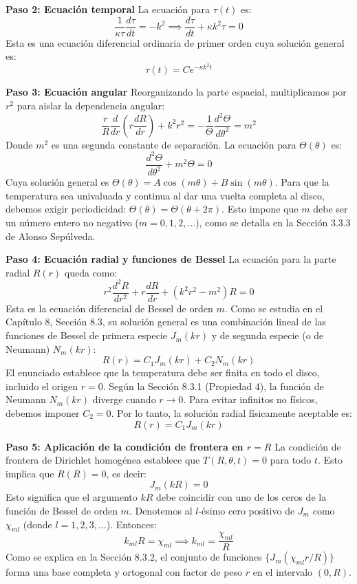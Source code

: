 \documentclass[a4paper]{article}
\begin{document}
\textbf{Paso 2: Ecuación temporal}
La ecuación para $\tau(t)$ es:
$$
\frac{1}{\kappa \tau} \frac{d\tau}{dt} = -k^2 \implies \frac{d\tau}{dt} + \kappa k^2 \tau = 0
$$
Esta es una ecuación diferencial ordinaria de primer orden cuya solución general es:
$$
\tau(t) = C e^{-\kappa k^2 t}
$$

\textbf{Paso 3: Ecuación angular}
Reorganizando la parte espacial, multiplicamos por $r^2$ para aislar la dependencia angular:
$$
\frac{r}{R} \frac{d}{dr}\left(r \frac{dR}{dr}\right) + k^2 r^2 = -\frac{1}{\Theta} \frac{d^2\Theta}{d\theta^2} = m^2
$$
Donde $m^2$ es una segunda constante de separación. La ecuación para $\Theta(\theta)$ es:
$$
\frac{d^2\Theta}{d\theta^2} + m^2 \Theta = 0
$$
Cuya solución general es $\Theta(\theta) = A \cos(m\theta) + B \sin(m\theta)$. Para que la temperatura sea univaluada y continua al dar una vuelta completa al disco, debemos exigir periodicidad: $\Theta(\theta) = \Theta(\theta + 2\pi)$. Esto impone que $m$ debe ser un número entero no negativo ($m = 0, 1, 2, \dots$), como se detalla en la Sección 3.3.3 de Alonso Sepúlveda.

\textbf{Paso 4: Ecuación radial y funciones de Bessel}
La ecuación para la parte radial $R(r)$ queda como:
$$
r^2 \frac{d^2R}{dr^2} + r \frac{dR}{dr} + (k^2 r^2 - m^2)R = 0
$$
Esta es la ecuación diferencial de Bessel de orden $m$. Como se estudia en el Capítulo 8, Sección 8.3, su solución general es una combinación lineal de las funciones de Bessel de primera especie $J_m(kr)$ y de segunda especie (o de Neumann) $N_m(kr)$:
$$
R(r) = C_1 J_m(kr) + C_2 N_m(kr)
$$
El enunciado establece que la temperatura debe ser finita en todo el disco, incluido el origen $r=0$. Según la Sección 8.3.1 (Propiedad 4), la función de Neumann $N_m(kr)$ diverge cuando $r \to 0$. Para evitar infinitos no físicos, debemos imponer $C_2 = 0$. Por lo tanto, la solución radial físicamente aceptable es:
$$
R(r) = C_1 J_m(kr)
$$

\textbf{Paso 5: Aplicación de la condición de frontera en $r=R$}
La condición de frontera de Dirichlet homogénea establece que $T(R, \theta, t) = 0$ para todo $t$. Esto implica que $R(R) = 0$, es decir:
$$
J_m(kR) = 0
$$
Esto significa que el argumento $kR$ debe coincidir con uno de los ceros de la función de Bessel de orden $m$. Denotemos al $l$-ésimo cero positivo de $J_m$ como $\chi_{ml}$ (donde $l = 1, 2, 3, \dots$). Entonces:
$$
k_{ml} R = \chi_{ml} \implies k_{ml} = \frac{\chi_{ml}}{R}
$$
Como se explica en la Sección 8.3.2, el conjunto de funciones $\{J_m(\chi_{ml} r / R)\}$ forma una base completa y ortogonal con factor de peso $r$ en el intervalo $(0, R)$.
\end{document}
